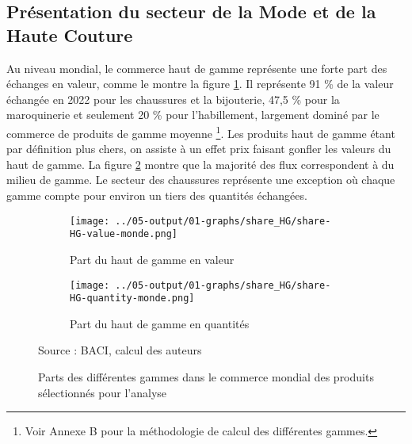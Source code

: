 \documentclass[french,10pt,a4paper]{article}
\begin{document}
\subsection{Présentation du secteur de la Mode et de la Haute Couture}

Au niveau mondial, le commerce haut de gamme représente une forte part des échanges en valeur, comme le montre la figure \ref{fig:share-HG-value-monde}. Il représente 91 \% de la valeur échangée en 2022 pour les chaussures et la bijouterie, 47,5 \% pour la maroquinerie et seulement 20 \% pour l'habillement, largement dominé par le commerce de produits de gamme moyenne \footnote{Voir Annexe B pour la méthodologie de calcul des différentes gammes.}. Les produits haut de gamme étant par définition plus chers, on assiste à un effet prix faisant gonfler les valeurs du haut de gamme. La figure \ref{fig:share-HG-quantity-monde} montre que la majorité des flux correspondent à du milieu de gamme. Le secteur des chaussures représente une exception où chaque gamme compte pour environ un tiers des quantités échangées.

\begin{figure}[!h]
  \centering
  \begin{subfigure}{\textwidth}
    \centering    
    \texttt{[image: ../05-output/01-graphs/share\_HG/share-HG-value-monde.png]}
    \caption{Part du haut de gamme en valeur}
    \label{fig:share-HG-value-monde}
  \end{subfigure}
  \vspace{0.5cm}
  \begin{subfigure}{\textwidth}
    \centering
 \texttt{[image: ../05-output/01-graphs/share\_HG/share-HG-quantity-monde.png]}
 \caption{Part du haut de gamme en quantités}
 \label{fig:share-HG-quantity-monde}
\end{subfigure}
\captionsetup{justification=raggedright,singlelinecheck=false, font=small}
  \caption*{Source : BACI, calcul des auteurs}
  \captionsetup{justification=centering, singlelinecheck=true, font=normalsize}
  \caption{Parts des différentes gammes dans le commerce mondial des produits sélectionnés pour l'analyse}
  \label{fig:share-HG-value-quantity-monde}
\end{figure}

\bigskip
\end{document}
